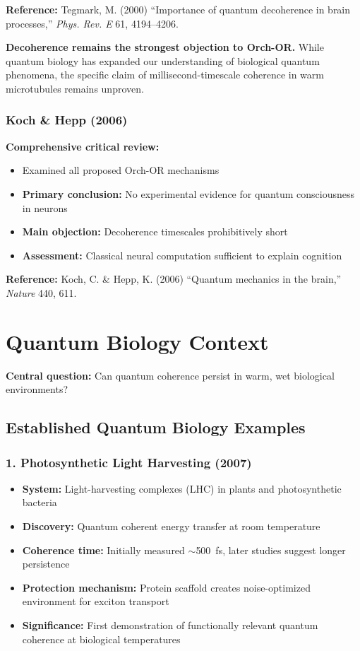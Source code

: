 \textbf{Reference:} Tegmark, M. (2000) ``Importance of quantum decoherence in brain processes,'' \textit{Phys. Rev. E} 61, 4194--4206.

\begin{warningbox}
\textbf{Decoherence remains the strongest objection to Orch-OR.} While quantum biology has expanded our understanding of biological quantum phenomena, the specific claim of millisecond-timescale coherence in warm microtubules remains unproven.
\end{warningbox}

\subsubsection{Koch \& Hepp (2006)}

\textbf{Comprehensive critical review:}
\begin{itemize}
\item Examined all proposed Orch-OR mechanisms
\item \textbf{Primary conclusion:} No experimental evidence for quantum consciousness in neurons
\item \textbf{Main objection:} Decoherence timescales prohibitively short
\item \textbf{Assessment:} Classical neural computation sufficient to explain cognition
\end{itemize}

\textbf{Reference:} Koch, C. \& Hepp, K. (2006) ``Quantum mechanics in the brain,'' \textit{Nature} 440, 611.

\section{Quantum Biology Context}

\textbf{Central question:} Can quantum coherence persist in warm, wet biological environments?

\subsection{Established Quantum Biology Examples}

\subsubsection{1. Photosynthetic Light Harvesting (2007)}

\begin{itemize}
\item \textbf{System:} Light-harvesting complexes (LHC) in plants and photosynthetic bacteria
\item \textbf{Discovery:} Quantum coherent energy transfer at room temperature
\item \textbf{Coherence time:} Initially measured $\sim$500~fs, later studies suggest longer persistence
\item \textbf{Protection mechanism:} Protein scaffold creates noise-optimized environment for exciton transport
\item \textbf{Significance:} First demonstration of functionally relevant quantum coherence at biological temperatures
\end{itemize}

